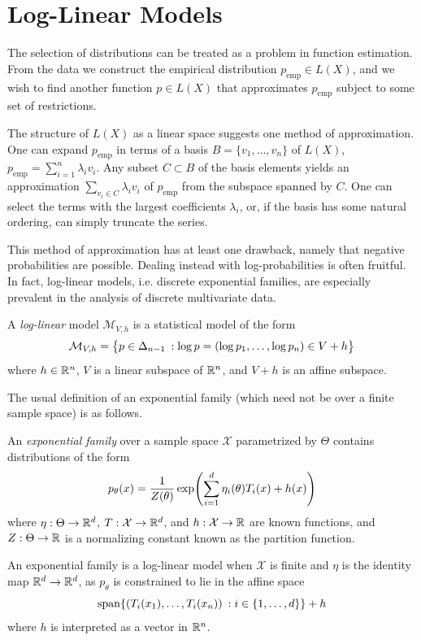 \documentclass[cclicense]{hmcthesis}
\providecommand*{\xs}{\mathcal X}
\providecommand*{\ms}{\mathcal M}
\newcommand*{\emp}{\mathrm{emp}}
\numberwithin{equation}{chapter}
\numberwithin{thmcounter}{chapter}
\begin{document}
\section{Log-Linear Models}
    \label{sec:linear-models}
    
    The selection of distributions can be treated as a problem in function
    estimation.  From the data we construct the empirical distribution \mbox{$p_\emp
    \in L(X)$}, and we wish to find another function $p \in L(X)$ that
    approximates $p_\emp$ subject to some set of restrictions.  
    
    The structure of $L(X)$ as a linear space suggests one method of
    approximation.  One can expand $p_\emp$ in terms of a basis $B = \{v_1,
    \ldots, v_n\}$ of $L(X)$, $p_\emp = \sum_{i=1}^n \lambda_i v_i$.  Any subset
    $C \subset B$ of the basis elements yields an approximation $\sum_{v_i \in
    C} \lambda_i v_i$ of $p_\emp$ from the subspace spanned by $C$.  One can
    select the terms with the largest coefficients $\lambda_i$, or, if the basis
    has some natural ordering, can simply truncate the series.

    This method of approximation has at least one drawback, namely that negative
    probabilities are possible.  Dealing instead with log-probabilities is often
    fruitful.  In fact, log-linear models, i.e. discrete exponential families,
    are especially prevalent in the analysis of discrete multivariate data.
    \begin{definition}
        A \emph{log-linear} model $\ms_{V,h}$ is a statistical model of the form
        \[
            \ms_{V,h} = \cdel[\big]{p \in \Delta_{n-1} \:: \log p = (\log p_1, \ldots,
            \log p_n) \in V + h}
        \]
        where $h \in \mathbb{R}^n$, $V$ is a linear subspace of $\mathbb{R}^n$, and $V + h$ is
        an affine subspace.
    \end{definition}

    The usual definition of an exponential family (which need not be over a
    finite sample space) is as follows.
    \begin{definition}
        An \emph{exponential family} over a sample space $\xs$ parametrized by
        $\Theta$ contains distributions of the form
        \[
            p_\theta(x) = 
            \frac 1 {Z(\theta)}
            \exp\pdel*{
                \displaystyle \sum_{i=1}^d \eta_i(\theta)T_i(x) + h(x)
            }
        \]
        where $\eta : \Theta \to \mathbb{R}^d$, $T:\xs \to \R^d$, and $h: \xs \to \R$
        are known functions, and $Z:\Theta \to \mathbb{R}$ is a normalizing constant
        known as the partition function.
    \end{definition}
    An exponential family is a log-linear model when $\xs$ is finite and $\eta$
    is the identity map $\mathbb{R}^d \to \mathbb{R}^d$, as $p_\theta$ is constrained to lie in
    the affine space
    \[
        \mathrm{span}\cdel*{
            (T_i(x_1), \ldots, T_i(x_n)) \:: i \in \{1, \ldots, d\}
        } + h
    \]
    where $h$ is interpreted as a vector in $\mathbb{R}^n$.  
\end{document}
